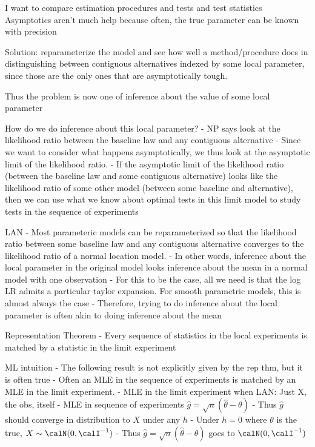 \documentclass[12pt]{article}
\theoremstyle{plain}
\theoremstyle{definition}
\theoremstyle{remark}
\begin{document}
I want to compare estimation procedures and tests and test statistics
Asymptotics aren't much help because often, the true parameter can be
known with precision

Solution: reparameterize the model and see how well a method/procedure
does in distinguishing between contiguous alternatives indexed by some
local parameter, since those are the only ones that are asymptotically
tough.

Thus the problem is now one of inference about the value of some local
parameter

How do we do inference about this local parameter?
- NP says look at the likelihood ratio between the baseline law and any
  contiguous alternative
- Since we want to consider what happens asymptotically, we thus look at
  the asymptotic limit of the likelihood ratio.
- If the asymptotic limit of the likelihood ratio (between the baseline
  law and some contiguous alternative) looks like the likelihood ratio
  of some other model (between some baseline and alternative),
  then we can use what we know about optimal tests in this limit model
  to study tests in the sequence of experiments

LAN
- Most parameteric models can be reparameterized so that the likelihood
  ratio between some baseline law and any contiguous alternative
  converges to the likelihood ratio of a normal location model.
- In other words, inference about the local parameter in the original
  model looks inference about the mean in a normal model with one
  observation
- For this to be the case, all we need is that the log LR admits a
  particular taylor expansion.
  For smooth parametric models, this is almost always the case
- Therefore, trying to do inference about the local parameter is often
  akin to doing inference about the mean

Representation Theorem
- Every sequence of statistics in the local experiments is matched by
  a statistic in the limit experiment

ML intuition
- The following result is not explicitly given by the rep thm, but it is
  often true
- Often an MLE in the sequence of experiments is matched by an MLE in
  the limit experiment.
- MLE in the limit experiment when LAN: Just X, the obs, itself
- MLE in sequence of experiments $\hat{g}=\sqrt{n}(\hat{\theta}-\theta)$
- Thus $\hat{g}$ should converge in distribution to $X$ under any $h$
- Under $h=0$ where $\theta$ is the true, $X\sim\calN(0,\calI^{-1})$
- Thus  $\hat{g}=\sqrt{n}(\hat{\theta}-\theta)$ goes to
  $\calN(0,\calI^{-1})$
\end{document}
